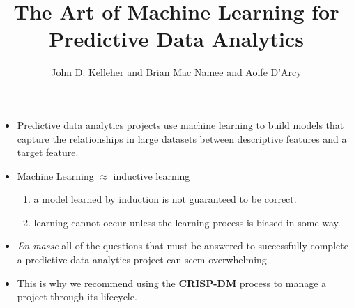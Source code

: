 \documentclass[xcolor={table}]{beamer}
\title{The Art of Machine Learning for Predictive Data Analytics}
\author{John D. Kelleher and Brian Mac Namee and Aoife D'Arcy}
\institute{}
\date{}
\newcommand{\keyword}[1]{\alert{\textbf{#1}}\index{#1}}
\begin{document}
\begin{frame}
	\titlepage
\end{frame}
\begin{frame}
	 \tableofcontents
\end{frame}

\begin{frame}
	\begin{itemize}
		\item Predictive data analytics projects use machine learning to build models that capture the relationships in large datasets between descriptive features and a target feature. 
		\item Machine Learning $\approx$ inductive learning
\begin{enumerate}
	\item a model learned by induction is not guaranteed to be correct. 
	\item learning cannot occur unless the learning process is biased in some way. 
\end{enumerate}
	\end{itemize}
\end{frame}

\begin{frame}
	\begin{itemize}
		\item \textit{En masse} all of the questions that must be answered to successfully complete a predictive data analytics project can seem overwhelming.
		\item  This is why we recommend using the  \keyword{CRISP-DM} process to manage a project through its lifecycle.
	\end{itemize}
\end{frame}

 \begin{frame}[plain]
\begin{table}
\renewcommand{\arraystretch}{1.5}
\end{table}
\end{frame} 
\end{document}
